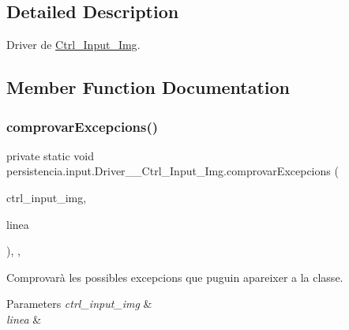 \subsection{Detailed Description}
Driver de \hyperlink{classpersistencia_1_1input_1_1Ctrl__Input__Img}{Ctrl\+\_\+\+Input\+\_\+\+Img}. 

\subsection{Member Function Documentation}
\mbox{\label{classpersistencia_1_1input_1_1Driver____Ctrl__Input__Img_a60b4011cee02b5c7fc213230db46d6e0}} 
\subsubsection{\texorpdfstring{comprovar\+Excepcions()}{comprovarExcepcions()}}
{\footnotesize\ttfamily private static void persistencia.\+input.\+Driver\+\_\+\+\_\+\+Ctrl\+\_\+\+Input\+\_\+\+Img.\+comprovar\+Excepcions (\begin{DoxyParamCaption}\item[{\hyperlink{classpersistencia_1_1input_1_1Ctrl__Input__Img}{Ctrl\+\_\+\+Input\+\_\+\+Img}}]{ctrl\+\_\+input\+\_\+img,  }\item[{String}]{linea }\end{DoxyParamCaption})\hspace{0.3cm}{\ttfamily [inline]}, {\ttfamily [static]}, {\ttfamily [private]}}



Comprovarà les possibles excepcions que puguin apareixer a la classe. 


\begin{DoxyParams}{Parameters}
{\em ctrl\+\_\+input\+\_\+img} & \\
\hline
{\em linea} & \\
\hline
\end{DoxyParams}

